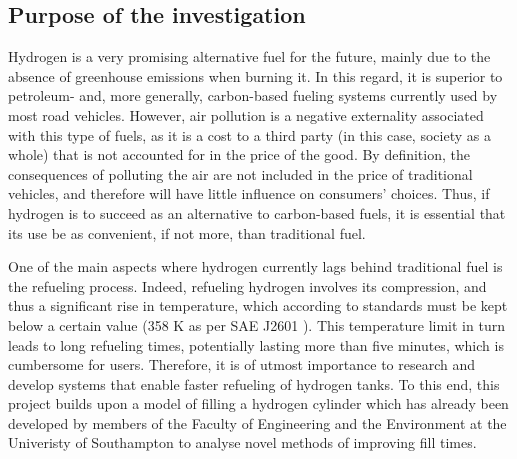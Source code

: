 
\subsection{Purpose of the investigation}

Hydrogen is a very promising alternative fuel for the future, mainly due to the absence of greenhouse emissions when burning it. In this regard, it is superior to petroleum- and, more generally, carbon-based fueling systems currently used by most road vehicles.  However, air pollution is a negative externality associated with this type of fuels, as it is a cost to a third party (in this case, society as a whole) that is not accounted for in the price of the good. By definition, the consequences of polluting the air are not included in the price of traditional vehicles, and therefore will have little influence on consumers' choices. Thus, if hydrogen is to succeed as an alternative to carbon-based fuels, it is essential that its use be as convenient, if not more, than traditional fuel.

 One of the main aspects where hydrogen currently lags behind traditional fuel is the refueling process. Indeed, refueling hydrogen involves its compression, and thus a significant rise in temperature, which according to standards must be kept below a certain value (358 \degree K as per SAE J2601 ). This temperature limit in turn leads to long refueling times, potentially lasting more than five minutes, which is cumbersome for users. Therefore, it is of utmost importance to research and develop systems that enable faster refueling of hydrogen tanks. To this end, this project builds upon a model of filling a hydrogen cylinder which has already been developed by members of the Faculty of Engineering and the Environment at the Univeristy of Southampton to analyse novel methods of improving fill times.

